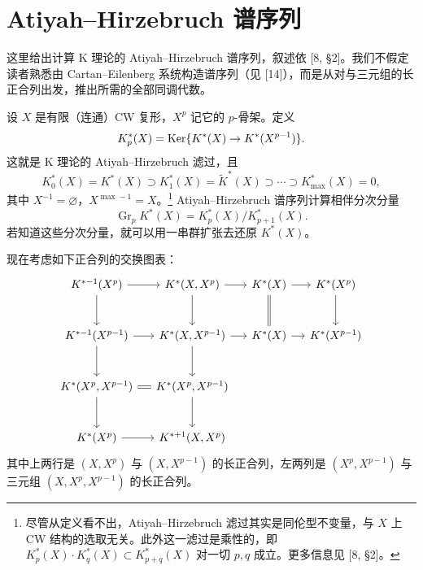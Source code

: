 \section{Atiyah--Hirzebruch 谱序列}

这里给出计算 K 理论的 Atiyah--Hirzebruch 谱序列，叙述依 [8, §2]。我们不假定读者熟悉由 Cartan--Eilenberg 系统构造谱序列（见 [14]），而是从对与三元组的长正合列出发，推出所需的全部同调代数。

设 $X$ 是有限（连通）CW 复形，$X^p$ 记它的 $p$-骨架。定义
\[
K^*_p(X)=\operatorname{Ker}\{K^*(X)\to K^*(X^{p-1})\}.
\]
这就是 K 理论的 Atiyah--Hirzebruch 滤过，且
\[
K^*_0(X)=K^*(X)\supset K^*_1(X)=\tilde K^*(X)\supset\cdots\supset K^*_{\max}(X)=0,
\]
其中 $X^{-1}=\varnothing$，$X^{\max-1}=X$。\footnote{尽管从定义看不出，Atiyah--Hirzebruch 滤过其实是同伦型不变量，与 $X$ 上 CW 结构的选取无关。此外这一滤过是乘性的，即 $K^*_p(X)\cdot K^*_q(X)\subset K^*_{p+q}(X)$ 对一切 $p,q$ 成立。更多信息见 [8, §2]。} Atiyah--Hirzebruch 谱序列计算相伴分次分量
\[
\operatorname{Gr}_p K^*(X)=K^*_p(X)\big/K^*_{p+1}(X).
\]
若知道这些分次分量，就可以用一串群扩张去还原 $K^*(X)$。

现在考虑如下正合列的交换图表：
\[
\begin{tikzcd}[column sep=small, row sep=large]
K^{*-1}(X^p) \arrow[r] \arrow[d] & K^*(X,X^p) \arrow[r] \arrow[d] & K^*(X) \arrow[r] \arrow[d,equal] & K^*(X^p) \arrow[d] \\
K^{*-1}(X^{p-1}) \arrow[r] \arrow[d] & K^*(X,X^{p-1}) \arrow[r] \arrow[d] & K^*(X) \arrow[r] & K^*(X^{p-1}) \\
K^*(X^p,X^{p-1}) \arrow[r,equal] \arrow[d] & K^*(X^p,X^{p-1}) \arrow[d] & & \\
K^*(X^p) \arrow[r] & K^{*+1}(X,X^p) & &
\end{tikzcd}
\]
其中上两行是 $(X,X^p)$ 与 $(X,X^{p-1})$ 的长正合列，左两列是 $(X^p,X^{p-1})$ 与三元组 $(X,X^p,X^{p-1})$ 的长正合列。


